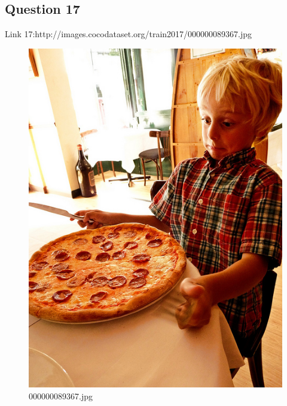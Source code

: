 \subsection*{Question 17}
Link 17:http://images.cocodataset.org/train2017/000000089367.jpg
    \begin{figure}[h]
        \centering
        \includegraphics[width=0.8\linewidth]{../image set/easy/000000089367.jpg}
        \caption{000000089367.jpg}
    \end{figure}
